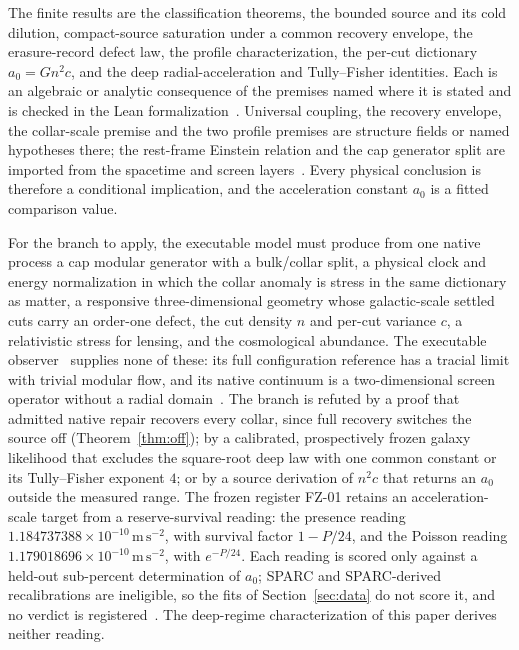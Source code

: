 \documentclass[11pt]{article}
\begin{document}
The finite results are the classification theorems, the bounded source and
its cold dilution, compact-source saturation under a common recovery
envelope, the erasure-record defect law, the profile characterization, the
per-cut dictionary \(a_0=Gn^2c\), and the deep radial-acceleration and
Tully--Fisher identities. Each is an algebraic or analytic consequence of the
premises named where it is stated and is checked in the Lean
formalization~\cite{ophlean}. Universal coupling, the recovery envelope, the
collar-scale premise and the two profile premises are structure fields or
named hypotheses there; the rest-frame Einstein relation and the cap
generator split are imported from the spacetime and screen
layers~\cite{ophEinstein,ophmicro}.
Every physical conclusion is therefore a conditional implication, and the
acceleration constant \(a_0\) is a fitted comparison value.

For the branch to apply, the executable model must produce from one native
process a cap modular generator with a bulk/collar split, a physical clock
and energy normalization in which the collar anomaly is stress in the same
dictionary as matter, a responsive three-dimensional geometry whose
galactic-scale settled cuts carry an order-one defect, the cut density \(n\)
and per-cut variance \(c\), a relativistic stress for lensing, and the
cosmological abundance. The executable observer~\cite{ophmodel} supplies
none of these: its
full configuration reference has a tracial limit with trivial modular flow,
and its native continuum is a two-dimensional screen operator without a
radial domain~\cite{ophtimefields,ophcontinuum}. The branch is refuted by a
proof that admitted native repair recovers every collar, since full recovery
switches the source off (Theorem~\ref{thm:off}); by a calibrated,
prospectively frozen galaxy likelihood that excludes the square-root deep law
with one common constant or its Tully--Fisher exponent \(4\); or by a source
derivation of \(n^2c\) that returns an \(a_0\) outside the measured range.
The frozen register FZ-01 retains an acceleration-scale target from a
reserve-survival reading: the presence reading
\(1.184737388\times10^{-10}\,\mathrm{m\,s^{-2}}\), with survival factor
\(1-P/24\), and the Poisson reading
\(1.179018696\times10^{-10}\,\mathrm{m\,s^{-2}}\), with \(e^{-P/24}\). Each
reading is scored only against a held-out sub-percent determination of
\(a_0\); SPARC and SPARC-derived recalibrations are ineligible, so the fits
of Section~\ref{sec:data} do not score it, and no verdict is
registered~\cite{ophladder}. The deep-regime characterization of this paper
derives neither reading.
\end{document}
